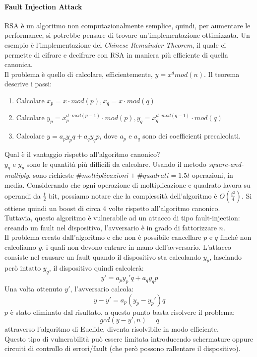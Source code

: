 \documentclass[a4paper,12pt]{article}
\begin{document}
\paragraph{Fault Injection Attack} RSA è un algoritmo non computazionalmente semplice, quindi, per aumentare le performance, si potrebbe pensare di trovare un'implementazione ottimizzata.
Un esempio è l'implementazione del \textit{Chinese Remainder Theorem}, il quale ci permette di cifrare e decifrare con RSA in maniera più efficiente di quella canonica. \\
Il problema è quello di calcolare, efficientemente, $y = x^d mod(n)$. Il teorema descrive i passi:
\begin{enumerate}
	\item Calcolare $x_p = x \cdot mod(p), x_q = x \cdot mod(q)$
	\item Calcolare $y_p = x_p^{d \cdot mod(p-1)} \cdot mod(p), y_q = x_q^{d \cdot mod(q-1)} \cdot mod(q)$ 
	\item Calcolare $y = a_py_pq + a_qy_qp$, dove $a_p$ e $a_q$ sono dei coefficienti precalcolati.
\end{enumerate}
Qual è il vantaggio rispetto all'algoritmo canonico? \\
$y_q$ e $y_p$ sono le quantità più difficili da calcolare. Usando il metodo \textit{square-and-multiply}, sono richieste $\#moltiplicazioni + \#quadrati = 1.5t$ operazioni, in media.
Considerando che ogni operazione di moltiplicazione e quadrato lavora su operandi da $\frac{t}{2}$ bit, possiamo notare che la complessità dell'algoritmo è $O(\frac{t^2}{4})$. Si ottiene quindi un boost di circa 4 volte rispetto all'algoritmo canonico. \\
Tuttavia, questo algoritmo è vulnerabile ad un attacco di tipo fault-injection: creando un fault nel dispositivo, l'avversario è in grado di fattorizzare $n$. \\
Il problema creato dall'algoritmo e che non è possibile cancellare $p$ e $q$ finché non calcoliamo $y$, i quali non devono entrare in mano dell'avversario. L'attacco consiste nel causare un fault quando il dispositivo sta calcolando $y_p$, lasciando però intatto $y_q$, il dispositivo quindi calcolerà:
$$y' = a_py_p'q + a_qy_qp$$
Una volta ottenuto $y'$, l'avversario calcola:
$$y - y' = a_p(y_p - y_p')q$$
$p$ è stato eliminato dal risultato, a questo punto basta risolvere il problema:
$$gcd(y - y', n) = q$$
attraverso l'algoritmo di Euclide, diventa risolvibile in modo efficiente. \\
Questo tipo di vulnerabilità può essere limitata introducendo schermature oppure circuiti di controllo di errori/fault (che però possono rallentare il dispositivo).
\end{document}
